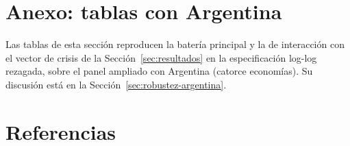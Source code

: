 

\section*{Anexo: tablas con Argentina}
\label{sec:anexo-argentina}

Las tablas de esta sección reproducen la batería principal y la de interacción con el vector de crisis de la Sección~\ref{sec:resultados} en la especificación log-log rezagada, sobre el panel ampliado con Argentina (catorce economías). Su discusión está en la Sección~\ref{sec:robustez-argentina}.

{\newcommand{\tablaalto}{0.62}}



\section*{Referencias}

